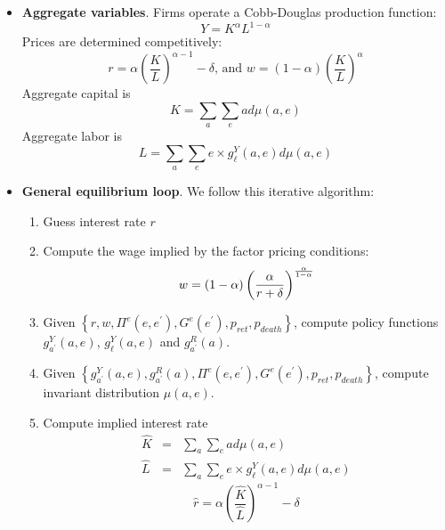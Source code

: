 \documentclass[12pt]{article}
\begin{document}
\begin{itemize}
\item \textbf{Aggregate variables}. Firms operate a Cobb-Douglas production
function:%
\begin{equation*}
Y=K^{\alpha }L^{1-\alpha }
\end{equation*}%
Prices are determined competitively:%
\begin{equation*}
r=\alpha \left( \frac{K}{L}\right) ^{\alpha -1}-\delta \text{, and }w=\left(
1-\alpha \right) \left( \frac{K}{L}\right) ^{\alpha }
\end{equation*}%
Aggregate capital is%
\begin{equation*}
K=\sum_{a}\sum_{e}ad\mu \left( a,e\right) 
\end{equation*}%
Aggregate labor is 
\begin{equation*}
L=\sum_{a}\sum_{e}e\times g_{\ell }^{Y}(a,e)d\mu \left( a,e\right) 
\end{equation*}

\item \textbf{General equilibrium loop}. We follow this iterative algorithm:

\begin{enumerate}
\item Guess interest rate $r$

\item Compute the wage implied by the factor pricing conditions:%
\begin{equation*}
w=\left( 1-\alpha \right) \left( \frac{\alpha }{r+\delta }\right) ^{\frac{%
\alpha }{1-\alpha }}
\end{equation*}

\item Given $\left\{ r,w,\Pi ^{e}(e,e^{\prime }),G^{e}(e^{\prime
}),p_{ret},p_{death}\right\} $, compute policy functions $g_{a^{\prime
}}^{Y}(a,e)$, $g_{\ell }^{Y}(a,e)$ and $g_{a^{\prime }}^{R}(a)$. 

\item Given $\left\{ g_{a^{\prime }}^{Y}(a,e),g_{a^{\prime }}^{R}(a),\Pi
^{e}(e,e^{\prime }),G^{e}(e^{\prime }),p_{ret},p_{death}\right\} $, compute
invariant distribution $\mu \left( a,e\right) $.

\item Compute implied interest rate%
\begin{eqnarray*}
\widehat{K} &=&\sum_{a}\sum_{e}ad\mu \left( a,e\right)  \\
\widehat{L} &=&\sum_{a}\sum_{e}e\times g_{\ell }^{Y}(a,e)d\mu \left(
a,e\right) 
\end{eqnarray*}
\begin{equation*}
\widehat{r}=\alpha \left( \frac{\widehat{K}}{\widehat{L}}\right) ^{\alpha
-1}-\delta 
\end{equation*}


\end{enumerate}
\end{itemize}
\end{document}
